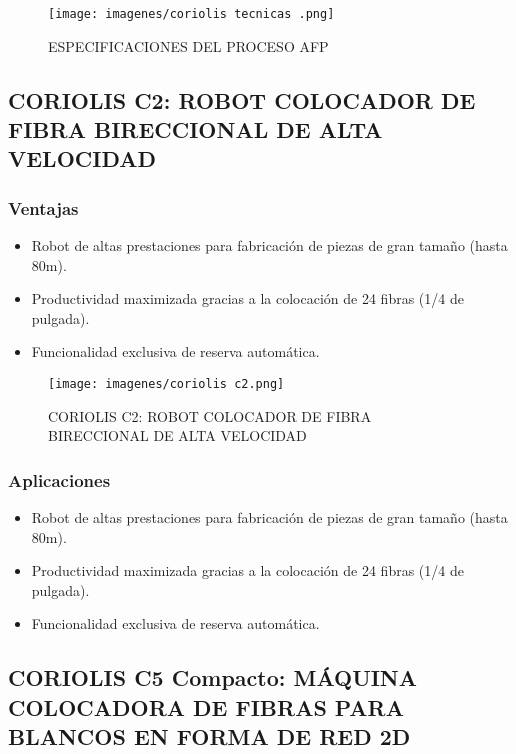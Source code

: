\begin{enumerate}[label=\arabic*.]
\begin{figure}[h]
    \centering
    \texttt{[image: imagenes/coriolis tecnicas .png]}
    \caption{ESPECIFICACIONES DEL PROCESO AFP}
    \label{fig:enter-label}
\end{figure}


\subsection{CORIOLIS C2: ROBOT COLOCADOR DE FIBRA BIRECCIONAL DE ALTA VELOCIDAD}

\subsubsection{Ventajas}

\begin{itemize}
   \item Robot de altas prestaciones para fabricación de piezas de gran tamaño (hasta 80m).
    \item Productividad maximizada gracias a la colocación de 24 fibras (1/4 de pulgada).
    \item Funcionalidad exclusiva de reserva automática.
\end{itemize}

\begin{figure}[h]
    \centering
    \texttt{[image: imagenes/coriolis c2.png]}
    \caption{CORIOLIS C2:  ROBOT COLOCADOR DE FIBRA BIRECCIONAL DE ALTA VELOCIDAD}
    \label{fig:enter-label}
\end{figure}



\subsubsection{Aplicaciones}
\begin{itemize}
    \item Robot de altas prestaciones para fabricación de piezas de gran tamaño (hasta 80m).
    \item Productividad maximizada gracias a la colocación de 24 fibras (1/4 de pulgada).
    \item Funcionalidad exclusiva de reserva automática.
\end{itemize}

\subsection{CORIOLIS C5 Compacto: MÁQUINA COLOCADORA DE FIBRAS
PARA BLANCOS EN FORMA DE RED 2D}


\end{enumerate}
